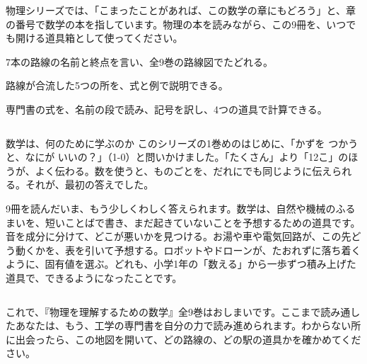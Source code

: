 物理シリーズでは、「こまったことがあれば、この数学の章にもどろう」と、章の番号で数学の本を指しています。物理の本を読みながら、この9冊を、いつでも開ける道具箱として使ってください。

\begin{furikaeri}
\begin{checklist}
\item 7本の路線の名前と終点を言い、全9巻の路線図でたどれる。
\item 路線が合流した5つの所を、式と例で説明できる。
\item 専門書の式を、名前の段で読み、記号を訳し、4つの道具で計算できる。
\end{checklist}
\end{furikaeri}

\begin{column}{数学は、何のために学ぶのか}
このシリーズの1巻めのはじめに、「かずを つかうと、なにが いいの？」（1-0）と問いかけました。「たくさん」より「12こ」のほうが、よく伝わる。数を使うと、ものごとを、だれにでも同じように伝えられる。それが、最初の答えでした。

9冊を読んだいま、もう少しくわしく答えられます。数学は、自然や機械のふるまいを、短いことばで書き、まだ起きていないことを予想するための道具です。音を成分に分けて、どこが悪いかを見つける。お湯や車や電気回路が、この先どう動くかを、表を引いて予想する。ロボットやドローンが、たおれずに落ち着くように、固有値を選ぶ。どれも、小学1年の「数える」から一歩ずつ積み上げた道具で、できるようになったことです。
\end{column}

\begin{bkfigure}
\end{bkfigure}

これで、『物理を理解するための数学』全9巻はおしまいです。ここまで読み通したあなたは、もう、工学の専門書を自分の力で読み進められます。わからない所に出会ったら、この地図を開いて、どの路線の、どの駅の道具かを確かめてください。

